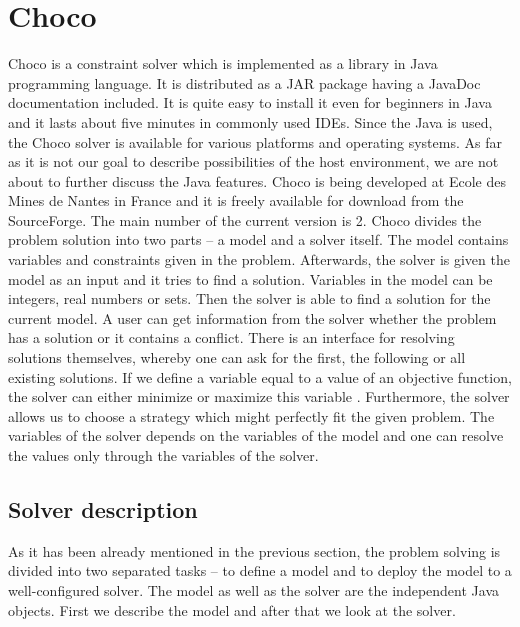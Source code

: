 \section{Choco}

Choco is a constraint solver which is implemented as a library in Java programming language.
It is distributed as a JAR package having a JavaDoc documentation included. It is quite easy
to install it even for beginners in Java and it lasts about five minutes in commonly used
IDEs. Since the Java is used, the Choco solver is available for various platforms
and operating systems. As far as it is not our goal to describe possibilities of the host environment, 
we are not about to further discuss the Java features. Choco is being developed
at Ecole des Mines de Nantes in France and it is freely available for download from 
the SourceForge. The main number of the current version is 2. Choco divides the problem solution
into two parts -- a model and a solver itself. The model contains variables and constraints given 
in the problem. Afterwards, the solver is given the model as an input and it tries to find a solution. 
Variables in the model can be integers, real numbers or sets. Then the solver is able to
find a solution for the current model. A user can get information from the solver whether the 
problem has a solution or it contains a conflict. There is an interface for resolving solutions themselves, 
whereby one can ask for the first, the following or all existing solutions. If we define a variable
equal to a value of an objective function, the solver can either minimize or maximize this variable .
Furthermore, the solver allows us to choose a strategy which might perfectly fit the given problem.
The variables of the solver depends on the variables of the model and one can resolve the values only through
the variables of the solver.

\subsection{Solver description}
As it has been already mentioned in the previous section, the problem solving is divided
into two separated tasks -- to define a model and to deploy the model to a well-configured solver.
The model as well as the solver are the independent Java objects. First we describe the 
model and after that we look at the solver. 

